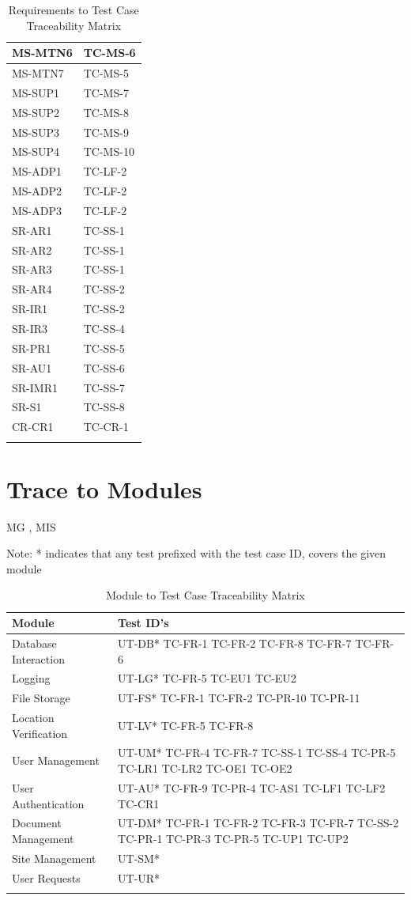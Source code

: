 \documentclass[12pt, titlepage]{article}
\begin{document}
\begin{longtable}{|l|l|}
  MS-MTN6 & TC-MS-6 \\ \hline
  MS-MTN7 & TC-MS-5 \\ \hline
  MS-SUP1 & TC-MS-7 \\ \hline
  MS-SUP2 & TC-MS-8 \\ \hline
  MS-SUP3 & TC-MS-9 \\ \hline
  MS-SUP4 & TC-MS-10 \\ \hline
  MS-ADP1 & TC-LF-2 \\ \hline
  MS-ADP2 & TC-LF-2 \\ \hline
  MS-ADP3 & TC-LF-2 \\ \hline
  SR-AR1 & TC-SS-1 \\ \hline
  SR-AR2 & TC-SS-1 \\ \hline
  SR-AR3 & TC-SS-1 \\ \hline
  SR-AR4 & TC-SS-2 \\ \hline
  SR-IR1 & TC-SS-2 \\ \hline
  SR-IR3 & TC-SS-4 \\ \hline
  SR-PR1 & TC-SS-5\\ \hline
  SR-AU1 & TC-SS-6 \\ \hline
  SR-IMR1 & TC-SS-7 \\ \hline
  SR-S1 & TC-SS-8 \\ \hline
  CR-CR1 & TC-CR-1 \\ \hline
  \caption{Requirements to Test Case Traceability Matrix}
\end{longtable}

\section{Trace to Modules}

MG \cite{MG},
MIS \cite{MIS}

Note: * indicates that any test prefixed with the test case ID,
covers the given module

\begin{longtable}{|m{5cm}|m{9cm}|}
  \hline
  \textbf{Module} & \textbf{Test ID's} \\
  \hline
  Database Interaction & UT-DB* TC-FR-1 TC-FR-2 TC-FR-8 TC-FR-7 TC-FR-6\\ \hline
  Logging & UT-LG* TC-FR-5 TC-EU1 TC-EU2\\ \hline
  File Storage & UT-FS* TC-FR-1 TC-FR-2 TC-PR-10 TC-PR-11\\ \hline
  Location Verification & UT-LV* TC-FR-5 TC-FR-8\\ \hline
  User Management & UT-UM* TC-FR-4 TC-FR-7 TC-SS-1 TC-SS-4 TC-PR-5
  TC-LR1 TC-LR2 TC-OE1 TC-OE2 \\ \hline
  User Authentication & UT-AU* TC-FR-9 TC-PR-4 TC-AS1 TC-LF1 TC-LF2
  TC-CR1\\ \hline
  Document Management & UT-DM* TC-FR-1 TC-FR-2 TC-FR-3 TC-FR-7
  TC-SS-2 TC-PR-1 TC-PR-3 TC-PR-5 TC-UP1 TC-UP2\\ \hline
  Site Management & UT-SM*\\ \hline
  User Requests & UT-UR*\\ \hline
  \caption{Module to Test Case Traceability Matrix}
\end{longtable}
\end{document}
